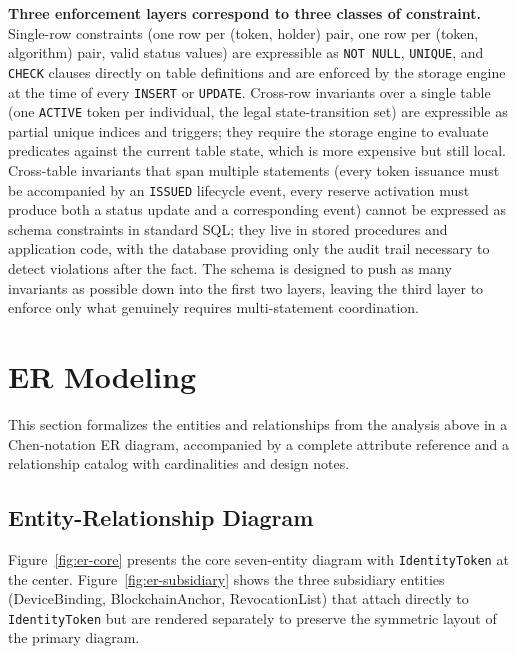 \documentclass[11pt,letterpaper]{article}
\newcommand{\entity}[1]{\texttt{\color{navydark}#1}}
\begin{document}
\textbf{Three enforcement layers correspond to three classes of constraint.} Single-row constraints (one row per (token, holder) pair, one row per (token, algorithm) pair, valid status values) are expressible as \texttt{NOT NULL}, \texttt{UNIQUE}, and \texttt{CHECK} clauses directly on table definitions and are enforced by the storage engine at the time of every \texttt{INSERT} or \texttt{UPDATE}. Cross-row invariants over a single table (one \texttt{ACTIVE} token per individual, the legal state-transition set) are expressible as partial unique indices and triggers; they require the storage engine to evaluate predicates against the current table state, which is more expensive but still local. Cross-table invariants that span multiple statements (every token issuance must be accompanied by an \texttt{ISSUED} lifecycle event, every reserve activation must produce both a status update and a corresponding event) cannot be expressed as schema constraints in standard SQL; they live in stored procedures and application code, with the database providing only the audit trail necessary to detect violations after the fact. The schema is designed to push as many invariants as possible down into the first two layers, leaving the third layer to enforce only what genuinely requires multi-statement coordination.

\section{ER Modeling}
\label{sec:er-modeling}

This section formalizes the entities and relationships from the analysis above in a Chen-notation ER diagram, accompanied by a complete attribute reference and a relationship catalog with cardinalities and design notes.

\subsection{Entity-Relationship Diagram}

Figure~\ref{fig:er-core} presents the core seven-entity diagram with \entity{IdentityToken} at the center. Figure~\ref{fig:er-subsidiary} shows the three subsidiary entities (DeviceBinding, BlockchainAnchor, RevocationList) that attach directly to \entity{IdentityToken} but are rendered separately to preserve the symmetric layout of the primary diagram.
\end{document}
